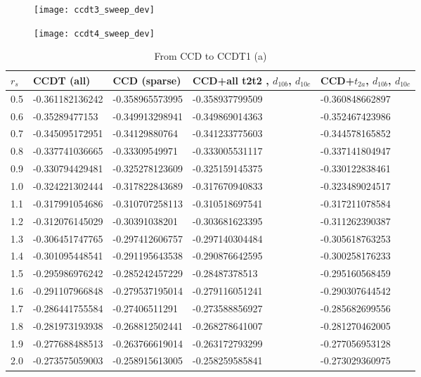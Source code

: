\begin{figure}[!htb]
  \centering
  \texttt{[image: ccdt3\_sweep\_dev]}
  \caption{}\label{fig:ccdt3_sweep_dev}
\endminipage\hfill
{}
  \centering
  \texttt{[image: ccdt4\_sweep\_dev]}
  \caption{}
\label{fig:ccdt4_sweep}
\endminipage\hfill
\end{figure}


\FloatBarrier

\begin{table}[h]
\caption{From CCD to CCDT1 (a)}
\begin{center}
\begin{threeparttable}
\begin{tabular}{l l l l l}
    \toprule
$r_s$ & CCDT (all) & CCD (sparse) & CCD+all t2t2 , $d_{10b}$, $d_{10c}$ & CCD+$t_{2a}$, $d_{10b}$, $d_{10c}$  \\ \hline
0.5 & -0.361182136242 & -0.358965573995 & -0.358937799509 & -0.360848662897   \\
0.6 & -0.35289477153 & -0.349913298941 & -0.349869014363 & -0.352467423986   \\
0.7 & -0.345095172951 & -0.34129880764 & -0.341233775603 & -0.344578165852   \\
0.8 & -0.337741036665 & -0.33309549971 & -0.333005531117 & -0.337141804947  \\
0.9 & -0.330794429481 & -0.325278123609 & -0.325159145375 & -0.330122838461   \\
1.0 & -0.324221302444 & -0.317822843689 & -0.317670940833 & -0.323489024517   \\
1.1 & -0.317991054686 & -0.310707258113 & -0.310518697541 & -0.317211078584  \\
1.2 & -0.312076145029 & -0.30391038201 & -0.303681623395 & -0.311262390387   \\
1.3 & -0.306451747765 & -0.297412606757 & -0.297140304484 & -0.305618763253   \\
1.4 & -0.301095448541 & -0.291195643538 & -0.290876642595 & -0.300258176233   \\
1.5 & -0.295986976242 & -0.285242457229 & -0.28487378513 & -0.295160568459   \\
1.6 & -0.291107966848 & -0.279537195014 & -0.279116051241 & -0.290307644542   \\
1.7 & -0.286441755584 & -0.27406511291 & -0.273588856927 & -0.285682699556   \\
1.8 & -0.281973193938 & -0.268812502441 & -0.268278641007 & -0.281270462005   \\
1.9 & -0.277688488513 & -0.263766619014 & -0.263172793299 & -0.277056953128   \\
2.0 & -0.273575059003 & -0.258915613005 & -0.258259585841 & -0.273029360975   \\
\bottomrule
\end{tabular}
\begin{tablenotes}
\end{tablenotes}
\end{threeparttable}
\end{center}
\label{tab:ccd_to_ccdt1_1}
\end{table}

